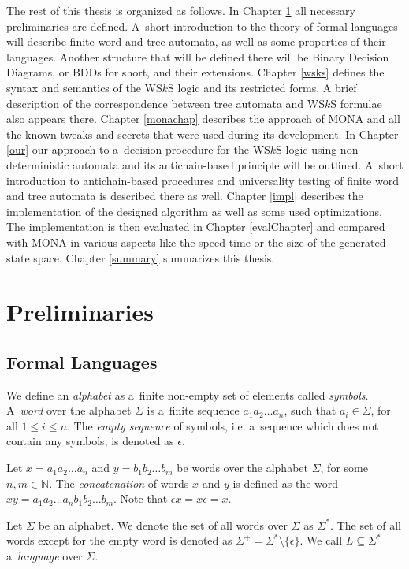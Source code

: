 The rest of this thesis is organized as follows. In Chapter \ref{preli} all
necessary preliminaries are defined. A~short introduction to the theory of
formal languages will describe finite word and tree automata, as well as some
properties of their languages. Another structure that will be defined there will
be Binary Decision Diagrams, or BDDs for short, and their extensions. Chapter
\ref{wsks} defines the syntax and semantics of the WS$k$S logic and its restricted
forms. A brief description of the correspondence between tree automata and
WS$k$S formulae also appears there.
Chapter \ref{monachap} describes the approach of \textsc{MONA} and all the known
tweaks and secrets that were used during its development. In Chapter \ref{our}
our approach to a~decision procedure for the WS$k$S logic using
non-deterministic automata and its antichain-based principle will be outlined.
A~short introduction to antichain-based procedures and universality testing of
finite word and tree automata is described there as well. Chapter \ref{impl}
describes the implementation of the designed algorithm as well as some
used optimizations. The implementation is then
evaluated in Chapter \ref{evalChapter} and compared with \textsc{MONA} in
various aspects like
the speed time or the size of the generated state space.
Chapter \ref{summary} summarizes this thesis.

\chapter{Preliminaries}\label{preli}

 \section{Formal Languages}

 We define an \emph{alphabet} as a~finite non-empty set of elements called
 \emph{symbols}. A~\emph{word} over the alphabet $\Sigma$ is a~finite sequence
 $a_1a_2\ldots a_n$, such that $a_i \in \Sigma$, for all $1 \leq i \leq n$. The
 \emph{empty sequence} of symbols, i.e. a~sequence  which does not contain any
 symbols, is denoted as $\epsilon$.

Let $x = a_1a_2\ldots a_n$ and $y = b_1b_2\ldots b_m$ be words over the alphabet
$\Sigma$, for some $n, m \in \mathbb{N}$. The \emph{concatenation} of words $x$
and $y$ is defined as the word $xy = a_1a_2\ldots a_nb_1b_2\ldots b_m$. Note
that $\epsilon x = x \epsilon = x$.

Let $\Sigma$ be an alphabet. We denote the set of all words over $\Sigma$ as
$\Sigma^*$. The set of all words except for the empty word is denoted as
$\Sigma^+ = \Sigma^* \setminus \{\epsilon\}$. We call $L \subseteq \Sigma^*$
a~\emph{language} over $\Sigma$.

